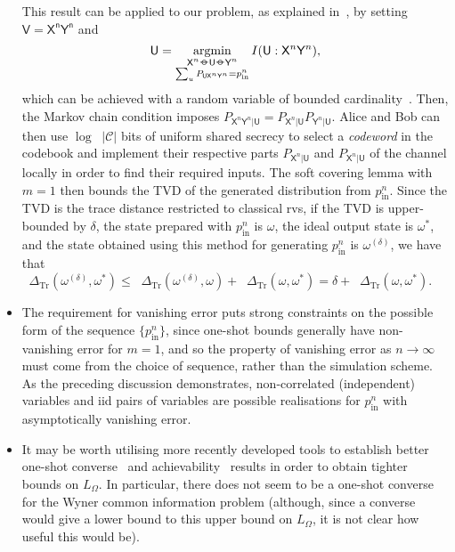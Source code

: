 \documentclass[10pt, a4paper]{article}
\numberwithin{equation}{section} %
\theoremstyle{definition}
\theoremstyle{plain}
\DeclareMathOperator*{\argmin}{argmin}
\newcommand{\abs}[1]{\mathop{}\left\lvert#1\right\rvert}
\newcommand{\?}{\mathrel{?}} %
\newcommand*\markov{\mathrel{\ooalign{\hidewidth$\circ$\hidewidth\cr$-$\cr}}} %
\newcommand{\Trdist}[2]{\mathop{}\Delta_\mathrm{Tr}\left(#1, #2\right)}
\newcommand{\crv}[1]{\mathsf{#1}}
\newcommand{\prin}[1][p]{#1_{\mathrm{in}}}
\begin{document}
\begin{itemize}
        This result can be applied to our problem, as explained in~\cite[Sec. V-B]{CorrReview}, by setting \(\crv{V} = \crv{X^n Y^n}\) and 
        \begin{equation}
          \crv{U} = \argmin_{\substack{
              \crv{X}^n \markov \crv{U} \markov \crv{Y}^n \\
              \sum_u P_{\crv{U}\crv{X}^n\crv{Y}^n} = \prin^n
            }
          } I(\crv{U}:\crv{X}^n\crv{Y}^n),
        \end{equation}
        which can be achieved with a random variable of bounded cardinality~\cite[Sec. VI.A]{DistrChanSynth}. Then, the Markov chain condition imposes \(P_{\crv{X}^n\crv{Y}^n|\crv{U}} = P_{\crv{X}^n|\crv{U}} P_{\crv{Y}^n|\crv{U}}\). Alice and Bob can then use \(\log \abs{\mathcal{C}}\) bits of uniform shared secrecy to select a \emph{codeword} in the codebook and implement their respective parts \(P_{\crv{X}^n|\crv{U}}\) and \(P_{\crv{X}^n|\crv{U}}\) of the channel locally in order to find their required inputs. The soft covering lemma with \(m=1\) then bounds the TVD of the generated distribution from \(\prin^n\). Since the TVD is the trace distance restricted to classical rvs, if the TVD is upper-bounded by \(\delta\), the state prepared with \(\prin^n\) is \(\omega\), the ideal output state is \(\omega^*\), and the state obtained using this method for generating \(\prin^n\) is \(\omega^{(\delta)}\), we have that \(\Trdist{\omega^{(\delta)}}{\omega^*} \leq \Trdist{\omega^{(\delta)}}{\omega} + \Trdist{\omega}{\omega^*} = \delta + \Trdist{\omega}{\omega^*}\).
      \item The requirement for vanishing error puts strong constraints on the possible form of the sequence \(\{\prin^n\}\), since one-shot bounds generally have non-vanishing error for \(m=1\), and so the property of vanishing error as \(n\to\infty\) must come from the choice of sequence, rather than the simulation scheme. As the preceding discussion demonstrates, non-correlated (independent) variables and iid pairs of variables are possible realisations for \(\prin^n\) with asymptotically vanishing error.
      \item It may be worth utilising more recently developed tools to establish better one-shot converse~\cite{BLIneqStrongConv} and achievability~\cite{PoissonMatch} results in order to obtain tighter bounds on \(L_{\Omega}\). In particular, there does not seem to be a one-shot converse for the Wyner common information problem (although, since a converse would give a lower bound to this upper bound on \(L_{\Omega}\), it is not clear how useful this would be).
    \end{itemize}
\end{document}
